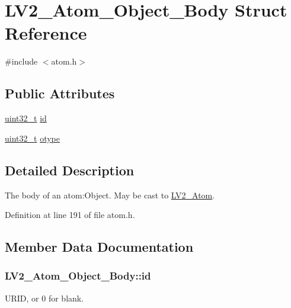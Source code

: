 \hypertarget{struct_l_v2___atom___object___body}{}\section{L\+V2\+\_\+\+Atom\+\_\+\+Object\+\_\+\+Body Struct Reference}
\label{struct_l_v2___atom___object___body}


{\ttfamily \#include $<$atom.\+h$>$}

\subsection*{Public Attributes}
\begin{DoxyCompactItemize}
\item 
\hyperlink{lib-src_2ffmpeg_2win32_2stdint_8h_a6eb1e68cc391dd753bc8ce896dbb8315}{uint32\+\_\+t} \hyperlink{struct_l_v2___atom___object___body_a234a147977d0bd89c66da1901fcf418b}{id}
\item 
\hyperlink{lib-src_2ffmpeg_2win32_2stdint_8h_a6eb1e68cc391dd753bc8ce896dbb8315}{uint32\+\_\+t} \hyperlink{struct_l_v2___atom___object___body_a275302d6dd5d94847097cd5b054c1b6a}{otype}
\end{DoxyCompactItemize}


\subsection{Detailed Description}
The body of an atom\+:Object. May be cast to \hyperlink{struct_l_v2___atom}{L\+V2\+\_\+\+Atom}. 

Definition at line 191 of file atom.\+h.



\subsection{Member Data Documentation}
\subsubsection[{\texorpdfstring{id}{id}}]{ L\+V2\+\_\+\+Atom\+\_\+\+Object\+\_\+\+Body\+::id}\hypertarget{struct_l_v2___atom___object___body_a234a147977d0bd89c66da1901fcf418b}{}\label{struct_l_v2___atom___object___body_a234a147977d0bd89c66da1901fcf418b}
U\+R\+ID, or 0 for blank. 

